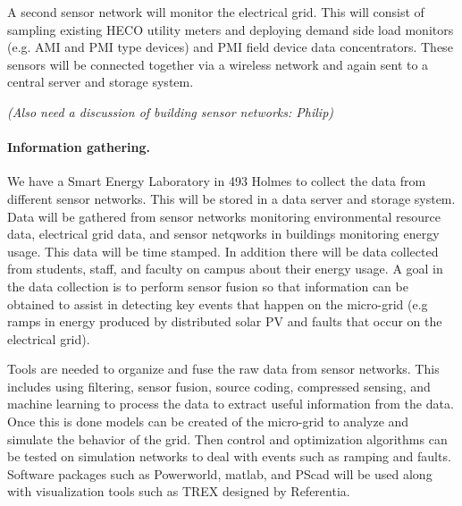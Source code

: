 A second sensor network will monitor the electrical grid.  This will
consist of sampling existing HECO utility meters and deploying demand side
load monitors (e.g.  AMI and PMI type devices) and PMI field device data
concentrators.  These sensors will be connected together via a wireless
network and again sent to a central server and storage system.

{\em (Also need a discussion of building sensor networks: Philip)}

\paragraph{Information gathering.}

We have a Smart Energy Laboratory in 493 Holmes to collect the data from
different sensor networks.  This will be stored in a data server and
storage system.  Data will be gathered from sensor networks monitoring
environmental resource data, electrical grid data, and sensor netqworks in
buildings monitoring energy usage.  This data will be time stamped.  In
addition there will be data collected from students, staff, and faculty on
campus about their energy usage.  A goal in the data collection is to
perform sensor fusion so that information can be obtained to assist in
detecting key events that happen on the micro-grid (e.g ramps in energy
produced by distributed solar PV and faults that occur on the electrical
grid).

Tools are needed to organize and fuse the raw data from sensor networks.
This includes using filtering, sensor fusion, source coding, compressed
sensing, and machine learning to process the data to extract useful
information from the data.  Once this is done models can be created of the
micro-grid to analyze and simulate the behavior of the grid.  Then control
and optimization algorithms can be tested on simulation networks to deal
with events such as ramping and faults.  Software packages such as
Powerworld, matlab, and PScad will be used along with visualization tools
such as TREX designed by Referentia.




  


 



